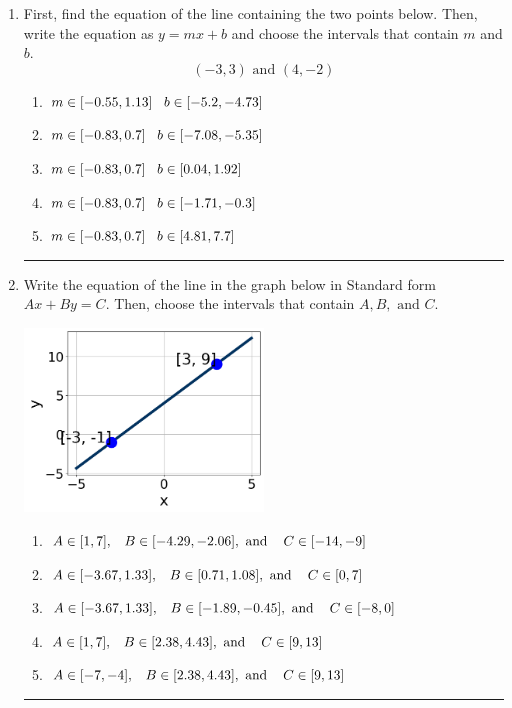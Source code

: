 \documentclass[14pt]{extbook}
\newcommand{\litem}[1]{\item#1\hspace*{-1cm}\rule{\textwidth}{0.4pt}}
\begin{document}
\begin{enumerate}
{\begin{enumerate}[label=\Alph*.]
\end{enumerate} }
\litem{
First, find the equation of the line containing the two points below. Then, write the equation as $ y=mx+b $ and choose the intervals that contain $m$ and $b$.\[ (-3, 3) \text{ and } (4, -2) \]\begin{enumerate}[label=\Alph*.]
\item \( m \in [-0.55, 1.13] \hspace*{3mm} b \in [-5.2, -4.73] \)
\item \( m \in [-0.83, 0.7] \hspace*{3mm} b \in [-7.08, -5.35] \)
\item \( m \in [-0.83, 0.7] \hspace*{3mm} b \in [0.04, 1.92] \)
\item \( m \in [-0.83, 0.7] \hspace*{3mm} b \in [-1.71, -0.3] \)
\item \( m \in [-0.83, 0.7] \hspace*{3mm} b \in [4.81, 7.7] \)

\end{enumerate} }
\litem{
Write the equation of the line in the graph below in Standard form $Ax+By=C$. Then, choose the intervals that contain $A, B, \text{ and } C$.
\begin{center}
    \includegraphics[width=0.5\textwidth]{../Figures/linearGraphToStandardCopyB.png}
\end{center}
\begin{enumerate}[label=\Alph*.]
\item \( A \in [1, 7], \hspace{3mm} B \in [-4.29, -2.06], \text{ and } \hspace{3mm} C \in [-14, -9] \)
\item \( A \in [-3.67, 1.33], \hspace{3mm} B \in [0.71, 1.08], \text{ and } \hspace{3mm} C \in [0, 7] \)
\item \( A \in [-3.67, 1.33], \hspace{3mm} B \in [-1.89, -0.45], \text{ and } \hspace{3mm} C \in [-8, 0] \)
\item \( A \in [1, 7], \hspace{3mm} B \in [2.38, 4.43], \text{ and } \hspace{3mm} C \in [9, 13] \)
\item \( A \in [-7, -4], \hspace{3mm} B \in [2.38, 4.43], \text{ and } \hspace{3mm} C \in [9, 13] \)


\end{enumerate}}
\end{enumerate}
\end{document}
